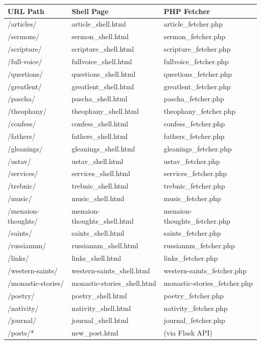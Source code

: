 \documentclass[12pt]{article}
\begin{document}
{\footnotesize
\begin{longtable}{lll}
\toprule
\textbf{URL Path} & \textbf{Shell Page} & \textbf{PHP Fetcher} \\
\midrule
/articles/ & article\_shell.html & article\_fetcher.php \\
/sermons/ & sermon\_shell.html & sermon\_fetcher.php \\
/scripture/ & scripture\_shell.html & scripture\_fetcher.php \\
/full-voice/ & fullvoice\_shell.html & fullvoice\_fetcher.php \\
/questions/ & questions\_shell.html & questions\_fetcher.php \\
/greatlent/ & greatlent\_shell.html & greatlent\_fetcher.php \\
/pascha/ & pascha\_shell.html & pascha\_fetcher.php \\
/theophany/ & theophany\_shell.html & theophany\_fetcher.php \\
/confess/ & confess\_shell.html & confess\_fetcher.php \\
/fathers/ & fathers\_shell.html & fathers\_fetcher.php \\
/gleanings/ & gleanings\_shell.html & gleanings\_fetcher.php \\
/ustav/ & ustav\_shell.html & ustav\_fetcher.php \\
/services/ & services\_shell.html & services\_fetcher.php \\
/trebnic/ & trebnic\_shell.html & trebnic\_fetcher.php \\
/music/ & music\_shell.html & music\_fetcher.php \\
/menaion-thoughts/ & menaion-thoughts\_shell.html & menaion-thoughts\_fetcher.php \\
/saints/ & saints\_shell.html & saints\_fetcher.php \\
/russiannm/ & russiannm\_shell.html & russiannm\_fetcher.php \\
/links/ & links\_shell.html & links\_fetcher.php \\
/western-saints/ & western-saints\_shell.html & western-saints\_fetcher.php \\
/monastic-stories/ & monastic-stories\_shell.html & monastic-stories\_fetcher.php \\
/poetry/ & poetry\_shell.html & poetry\_fetcher.php \\
/nativity/ & nativity\_shell.html & nativity\_fetcher.php \\
/journal/ & journal\_shell.html & journal\_fetcher.php \\
/posts/* & new\_post.html & (via Flask API) \\
\bottomrule
\end{longtable}
}
\end{document}
